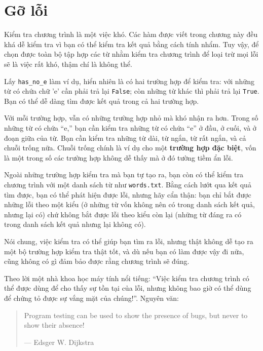 \documentclass[11pt]{book}
\begin{document}
\section{Gỡ lỗi}


Kiểm tra chương trình là một việc khó. Các hàm được viết trong chương
này đều khá dễ kiểm tra vì bạn có thể kiểm tra kết quả bằng cách tính
nhẩm. Tuy vậy, để chọn được toàn bộ tập hợp các từ nhằm kiểm tra 
chương trình để loại trừ mọi lỗi sẽ là việc rất khó, thậm chí là 
không thể.

Lấy \verb"has_no_e" làm ví dụ, hiển nhiên là có hai trường hợp để
kiểm tra: với những từ có chứa chữ 'e' cần phải trả lại {\tt False};
còn những từ khác thì phải trả lại {\tt True}. Bạn có thể dễ dàng
tìm được kết quả trong cả hai trường hợp.

Với mỗi trường hợp, vẫn có những trường hợp nhỏ mà khó nhận ra hơn. 
Trong số những từ có chứa ``e,'' bạn cần kiểm tra những từ có chứa ``e''
ở đầu, ở cuối, và ở đoạn giữa của từ. Bạn cần kiểm tra những từ dài,
từ ngắn, từ rất ngắn, và cả chuỗi trống nữa. Chuỗi trống chính là ví dụ
cho một {\bf trường hợp đặc biệt}, vốn là một trong số các trường hợp
không dễ thấy mà ở đó tường tiềm ẩn lỗi.


Ngoài những trường hợp kiểm tra mà bạn tự tạo ra, bạn còn có thể 
kiểm tra chương trình với một danh sách từ như {\tt words.txt}. 
Bằng cách lướt qua kết quả tìm được, bạn có thể phát hiện được lỗi,
nhưng hãy cẩn thận: bạn chỉ bắt được những lỗi theo một kiểu (ở
những từ vốn không nên có trong danh sách kết quả, nhưng lại có)
chứ không bắt được lỗi theo kiểu còn lại (những từ đáng ra có
trong danh sách kết quả nhưng lại không có).

Nói chung, việc kiểm tra có thể giúp bạn tìm ra lỗi, nhưng thật
không dễ tạo ra một bộ trường hợp kiểm tra thật tốt, và dù nếu bạn
có làm được vậy đi nữa, cũng không có gì đảm bảo được rằng chương
trình sẽ đúng.


Theo lời một nhà khoa học máy tính nổi tiếng: ``Việc kiểm tra chương trình
có thể được dùng để cho thấy sự tồn tại của lỗi, nhưng không bao giờ
có thể dùng để chứng tỏ được sự vắng mặt của chúng!''. Nguyên văn:

\begin{quote}
Program testing can be used to show the presence of bugs, but never to
show their absence!

--- Edsger W. Dijkstra
\end{quote}
\end{document}
